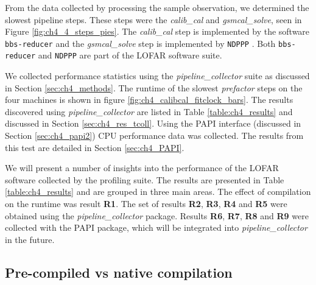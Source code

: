 From the data collected by processing the sample observation, we determined the slowest pipeline steps. These steps were the \textit{calib\_cal} and \textit{gsmcal\_solve}, seen in Figure \ref{fig:ch4_4_steps_pies}. The \textit{calib\_cal} step is implemented by the software \texttt{bbs-reducer} \citep{cookbook,bbs_selfcal} and the \textit{gsmcal\_solve} step is implemented by \texttt{NDPPP} \citep{cookbook,lofar_NDPPP}. Both \texttt{bbs-reducer} and \texttt{NDPPP} are part of the LOFAR software suite.

We collected performance statistics using the \textit{pipeline\_collector} suite as discussed in Section \ref{sec:ch4_methods}. The runtime of the slowest \textit{prefactor} steps on the four machines is shown in figure \ref{fig:ch4_calibcal_fitclock_bars}. The results discovered using \textit{pipeline\_collector} are listed in Table \ref{table:ch4_results} and discussed in Section \ref{sec:ch4_res_tcoll}. Using the PAPI interface (discussed in Section \ref{sec:ch4_papi2}) CPU performance data was collected. The results from this test are detailed in Section \ref{sec:ch4_PAPI}.


 
We will present a number of insights into the performance of the LOFAR software collected by the profiling suite. The results are presented in Table \ref{table:ch4_results} and are grouped in three main areas. The effect of compilation on the runtime was result \textbf{R1}. The set of results \textbf{R2}, \textbf{R3}, \textbf{R4} and \textbf{R5} were obtained using the \textit{pipeline\_collector} package. Results  \textbf{R6}, \textbf{R7}, \textbf{R8} and \textbf{R9} were collected with the PAPI package, which will be integrated into \textit{pipeline\_collector} in the future.  

\subsection{Pre-compiled vs native compilation}

